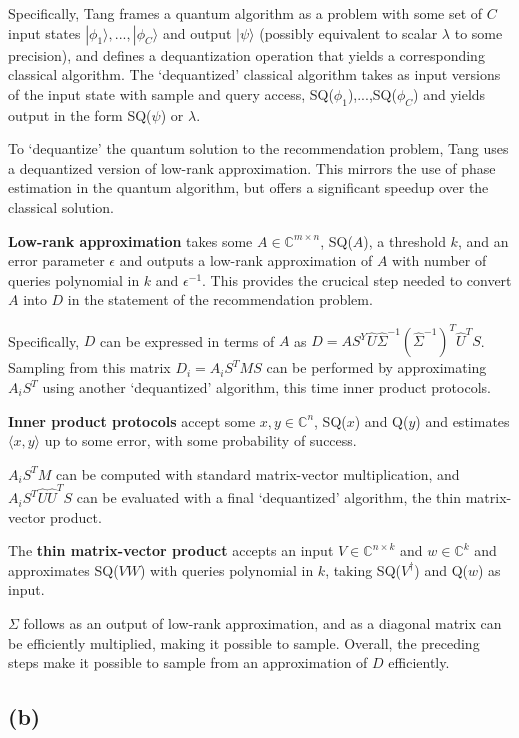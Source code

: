 \documentclass{article}
\begin{document}
Specifically, Tang frames a quantum algorithm as a problem with some set of $C$ input states $|\phi_1\rangle,...,|\phi_C\rangle$ and output $|\psi\rangle$ (possibly equivalent to scalar $\lambda$ to some precision), and defines a dequantization operation that yields a corresponding classical algorithm. The `dequantized' classical algorithm takes as input versions of the input state with sample and query access, SQ($\phi_1$),...,SQ($\phi_C$) and yields output in the form SQ($\psi$) or $\lambda$.

To `dequantize' the quantum solution to the recommendation problem, Tang uses a dequantized version of low-rank approximation. This mirrors the use of phase estimation in the quantum algorithm, but offers a significant speedup over the classical solution.

\textbf{Low-rank approximation} takes some $A\in\mathbb{C}^{m\times n}$, SQ($A$), a threshold $k$, and an error parameter $\epsilon$ and outputs a low-rank approximation of $A$ with number of queries polynomial in $k$ and $\epsilon^{-1}$. This provides the crucical step needed to convert $A$ into $D$ in the statement of the recommendation problem.

Specifically, $D$ can be expressed in terms of $A$ as $D=AS^Y\hat{U}\hat{\Sigma}^{-1}(\hat{\Sigma}^{-1})^T\hat{U}^TS$.
Sampling from this matrix $D_i=A_iS^TMS$ can be performed by approximating $A_iS^T$ using another `dequantized' algorithm, this time inner product protocols.

\textbf{Inner product protocols} accept some $x,y\in\mathbb{C}^n$, SQ($x$) and Q($y$) and estimates $\langle x,y\rangle$ up to some error, with some probability of success.

$A_iS^TM$ can be computed with standard matrix-vector multiplication, and $A_iS^T\hat{U}\hat{U}^TS$ can be evaluated with a final `dequantized' algorithm, the thin matrix-vector product.

The \textbf{thin matrix-vector product} accepts an input $V\in\mathbb{C}^{n\times k}$ and $w\in\mathbb{C}^k$ and approximates SQ($VW$) with queries polynomial in $k$, taking SQ($V^\dagger$) and Q($w$) as input.

$\Sigma$ follows as an output of low-rank approximation, and as a diagonal matrix can be efficiently multiplied, making it possible to sample. Overall, the preceding steps make it possible to sample from an approximation of $D$ efficiently.

\subsection{(b)}
\end{document}
